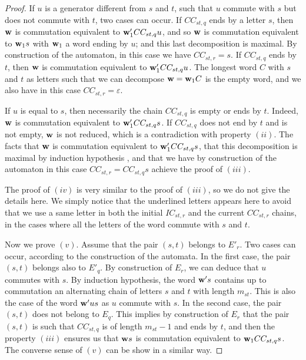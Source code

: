 \documentclass[reqno,12pt]{amsart}
\theoremstyle{definition}
\begin{document}
\begin{proof}
 If $u$ is a generator different from $s$ and $t$, such that $u$ commute with $s$ but does not commute with $t$, two cases can occur. If $CC_{st, q}$ ends by a letter $s$, then ${\bf w}$ is commutation equivalent to ${\bf w}_1'CC_{st,q}u$, and so   ${\bf w}$ is commutation equivalent to ${\bf w}_1s$ with ${\bf w}_1$ a word ending by $u$; and this last decomposition is maximal. By construction of the automaton, in this case we have $CC_{st,r}=s$. If $CC_{st, q}$ ends by $t$, then ${\bf w}$ is commutation equivalent to  ${\bf w}_1'CC_{st,q}u$. The longest word $C$ with $s$ and $t$ as letters such that we can decompose ${\bf w}={\bf w}_1C$ is the empty word, and we also have in this case $CC_{st,r}=\varepsilon$.
 
If $u$ is equal to $s$, then necessarily the chain $CC_{st,q}$ is empty or ends by $t$. Indeed,  ${\bf w}$ is commutation equivalent to ${\bf w}_1'CC_{st,q}s$. If $CC_{st,q}$ does not end by $t$ and is not empty, ${\bf w}$ is not reduced, which is a contradiction with property $(ii)$. The facts that  ${\bf w}$ is commutation equivalent to ${\bf w}_1'CC_{st,q}s$, that this decomposition is maximal by induction hypothesis , and that we have by construction of the automaton in this case $CC_{st,r}=CC_{st,q}s$ achieve the proof of $(iii)$.
 
\medskip 
 
The proof of $(iv)$ is very similar to the proof of  $(iii)$, so we do not give the details here. We simply notice that the underlined letters appears here to avoid that we use a same letter in both the initial $IC_{st,r}$ and the current $CC_{st,r}$  chains, in the cases where all the letters of the word commute with $s$ and $t$.

\medskip
 
Now we prove $(v)$. Assume that the pair $(s,t)$ belongs to $E'_r$. Two cases can occur, according to the construction of the automata. In the first case, the pair $(s,t)$ belongs also to $E'_q$. By construction of $E_r$, we can deduce that $u$ commutes with $s$. By induction hypothesis, the word ${\bf w}'s$ contains up to commutation an alternating chain of letters  $s$ and $t$ with length $m_{st}$. This is also the case of the word ${\bf w}'us$ as $u$ commute with $s$. In the second case, the pair $(s,t)$ does not belong to $E_q$. This implies by construction of $E_r$ that the pair $(s,t)$ is such that $CC_{st,q}$ is of length $m_{st}-1$ and ends by $t$, and then the property $(iii)$ ensures us that ${\bf w}s$ is commutation equivalent to ${\bf w}_1CC_{st,q}s$. The converse sense of $(v)$ can be show in a similar way.\end{proof}
\end{document}

